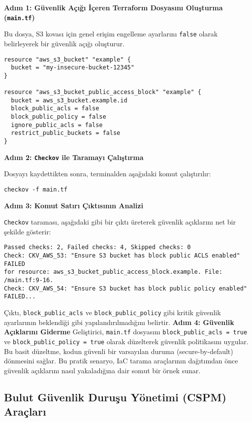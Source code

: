 \textbf{Adım 1: Güvenlik Açığı İçeren Terraform Dosyasını Oluşturma (\texttt{main.tf})}

Bu dosya, S3 kovası için genel erişim engelleme ayarlarını \texttt{false} olarak belirleyerek bir güvenlik açığı oluşturur.

\begin{verbatim}
resource "aws_s3_bucket" "example" {
  bucket = "my-insecure-bucket-12345"
}

resource "aws_s3_bucket_public_access_block" "example" {
  bucket = aws_s3_bucket.example.id
  block_public_acls = false
  block_public_policy = false
  ignore_public_acls = false
  restrict_public_buckets = false
}
\end{verbatim}

\textbf{Adım 2: \texttt{Checkov} ile Taramayı Çalıştırma}

Dosyayı kaydettikten sonra, terminalden aşağıdaki komut çalıştırılır:

\begin{verbatim}
checkov -f main.tf
\end{verbatim}
\textbf{Adım 3: Komut Satırı Çıktısının Analizi}

\texttt{Checkov} taraması, aşağıdaki gibi bir çıktı üreterek güvenlik açıklarını net bir şekilde gösterir:

\begin{verbatim}
Passed checks: 2, Failed checks: 4, Skipped checks: 0
Check: CKV_AWS_53: "Ensure S3 bucket has block public ACLS enabled" FAILED 
for resource: aws_s3_bucket_public_access_block.example. File: /main.tf:9-16.
Check: CKV_AWS_54: "Ensure S3 bucket has block public policy enabled" FAILED...
\end{verbatim}
Çıktı, \texttt{block\_public\_acls} ve \texttt{block\_public\_policy} gibi kritik güvenlik ayarlarının beklendiği gibi yapılandırılmadığını belirtir.
\textbf{Adım 4: Güvenlik Açıklarını Giderme}
Geliştirici, \texttt{main.tf} dosyasını \texttt{block\_public\_acls = true} ve \texttt{block\_public\_policy = true} olarak düzelterek güvenlik politikasını uygular. Bu basit düzeltme, kodun güvenli bir varsayılan duruma (secure-by-default) dönmesini sağlar. Bu pratik senaryo, IaC tarama araçlarının dağıtımdan önce güvenlik açıklarını nasıl yakaladığına dair somut bir örnek sunar.

\subsection{Bulut Güvenlik Duruşu Yönetimi (CSPM) Araçları}

